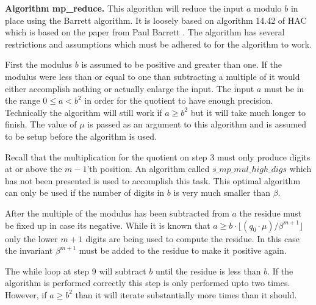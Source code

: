 \documentclass[b5paper]{book}
\begin{document}
\textbf{Algorithm mp\_reduce.}
This algorithm will reduce the input $a$ modulo $b$ in place using the Barrett algorithm.  It is loosely based on algorithm 14.42 of HAC
\cite[pp.  602]{HAC} which is based on the paper from Paul Barrett \cite{BARRETT}.  The algorithm has several restrictions and assumptions which must be adhered to
for the algorithm to work.

First the modulus $b$ is assumed to be positive and greater than one.  If the modulus were less than or equal to one than subtracting
a multiple of it would either accomplish nothing or actually enlarge the input.  The input $a$ must be in the range $0 \le a < b^2$ in order
for the quotient to have enough precision.  Technically the algorithm will still work if $a \ge b^2$ but it will take much longer to finish.  The
value of $\mu$ is passed as an argument to this algorithm and is assumed to be setup before the algorithm is used.  

Recall that the multiplication for the quotient on step 3 must only produce digits at or above the $m-1$'th position.  An algorithm called 
$s\_mp\_mul\_high\_digs$ which has not been presented is used to accomplish this task.  This optimal algorithm can only be used if the number
of digits in $b$ is very much smaller than $\beta$.  

After the multiple of the modulus has been subtracted from $a$ the residue must be fixed up in case its negative.  While it is known that 
$a \ge b \cdot \lfloor (q_0 \cdot \mu) / \beta^{m+1} \rfloor$ only the lower $m+1$ digits are being used to compute the residue.  In this case 
the invariant $\beta^{m+1}$ must be added to the residue to make it positive again.  

The while loop at step 9 will subtract $b$ until the residue is less than $b$.  If the algorithm is performed correctly this step is only
performed upto two times.  However, if $a \ge b^2$ than it will iterate substantially more times than it should.
\end{document}
